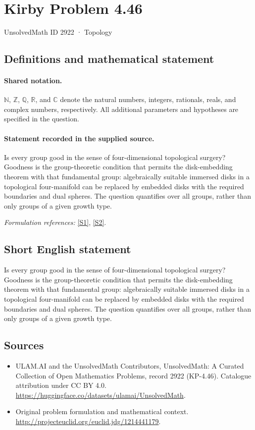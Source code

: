 \documentclass[11pt]{article}
\newcommand{\sref}[2]{\hyperlink{source:#1:#2}{[S#2]}}
\begin{document}
\setcounter{section}{2921}
\section{Kirby Problem 4.46}\label{2922}
{\small UnsolvedMath ID 2922 · Topology}
\subsection{Definitions and mathematical statement}

\paragraph{Shared notation.}$\mathbb N$, $\mathbb Z$, $\mathbb Q$, $\mathbb R$, and $\mathbb C$ denote the natural numbers, integers, rationals, reals, and complex numbers, respectively. All additional parameters and hypotheses are specified in the question.


\paragraph{Statement recorded in the supplied source.}
Is every group good in the sense of four-dimensional topological surgery? Goodness is the group-theoretic condition that permits the disk-embedding theorem with that fundamental group: algebraically suitable immersed disks in a topological four-manifold can be replaced by embedded disks with the required boundaries and dual spheres. The question quantifies over all groups, rather than only groups of a given growth type.
\par\smallskip\textit{Formulation references:} \sref{2922}{1}, \sref{2922}{2}.
\subsection{Short English statement}
Is every group good in the sense of four-dimensional topological surgery? Goodness is the group-theoretic condition that permits the disk-embedding theorem with that fundamental group: algebraically suitable immersed disks in a topological four-manifold can be replaced by embedded disks with the required boundaries and dual spheres. The question quantifies over all groups, rather than only groups of a given growth type.
\subsection{Sources}
\begin{itemize}
\item[\hypertarget{source:2922:1}{S1}] ULAM.AI and the UnsolvedMath Contributors, UnsolvedMath: A Curated Collection of Open Mathematics Problems, record 2922 (KP-4.46). Catalogue attribution under CC BY 4.0.
\url{https://huggingface.co/datasets/ulamai/UnsolvedMath}.
\item[\hypertarget{source:2922:2}{S2}] Original problem formulation and mathematical context.
\url{http://projecteuclid.org/euclid.jdg/1214441179}.
\end{itemize}
\label{end:2922}
\end{document}
